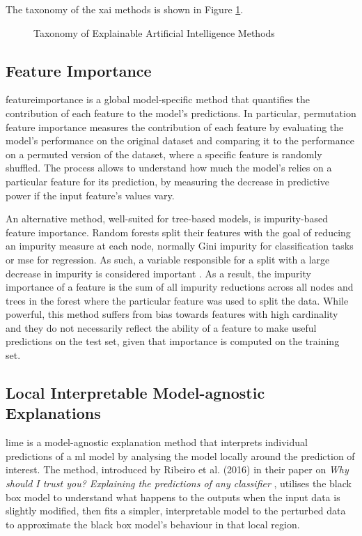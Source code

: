 The taxonomy of the \acrshort{xai} methods is shown in Figure \ref{fig:xai_taxonomy}.
\begin{figure}[h]
    \centering
    
    \caption{Taxonomy of Explainable Artificial Intelligence Methods \cite{Molnar2025}}
    \label{fig:xai_taxonomy}
\end{figure}

\subsection{Feature Importance} \label{sec:featureimportance}

\Gls{featureimportance} is a global model-specific method that quantifies the contribution of each feature to the model's predictions. In particular, permutation feature importance \cite{Breiman2001} measures the contribution of each feature by evaluating the model's performance on the original dataset and comparing it to the performance on a permuted version of the dataset, where a specific feature is randomly shuffled. The process allows to understand how much the model's relies on a particular feature for its prediction, by measuring the decrease in predictive power if the input feature's values vary.

An alternative method, well-suited for tree-based models, is impurity-based feature importance. Random forests split their features with the goal of reducing an impurity measure at each node, normally Gini impurity for classification tasks or \acrfull{mse} for regression. As such, a variable responsible for a split with a large decrease in impurity is considered important \cite{Nembrini2018}. As a result, the impurity importance of a feature is the sum of all impurity reductions across all nodes and trees in the forest where the particular feature was used to split the data. While powerful, this method suffers from bias towards features with high cardinality and they do not necessarily reflect the ability of a feature to make useful predictions on the test set, given that importance is computed on the training set. 

\subsection{Local Interpretable Model-agnostic Explanations} \label{sec:lime}

\acrfull{lime} is a model-agnostic explanation method that interprets individual predictions of a \acrlong{ml} model by analysing the model locally around the prediction of interest. The method, introduced by Ribeiro et al. (2016) in their paper on \textit{Why should I trust you? Explaining the predictions of any classifier} \cite{Ribeiro2016}, utilises the black box model to understand what happens to the outputs when the input data is slightly modified, then fits a simpler, interpretable model to the perturbed data to approximate the black box model's behaviour in that local region.

